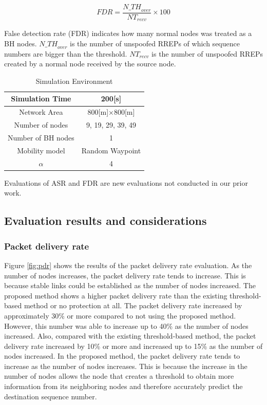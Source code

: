 \documentclass[conference]{IEEEtran}
\begin{document}
\begin{equation}
\label{eq:detectionRate}
FDR=\displaystyle \frac{{N\_TH}_{over}}{NT_{recv}} \times 100
\end{equation}

False detection rate (FDR) indicates how many normal nodes was treated as a BH nodes. ${N\_TH}_{over}$ is the number of unspoofed RREPs of which sequence numbers are bigger than the threshold. $NT_{recv}$ is the number of unspoofed RREPs created by a normal node received by the source node.

\begin{table}[htbp]
\begin{center}
\caption{Simulation Environment}
\label{tab:simEnviro}
\begin{tabular}{|c||c|}
\hline
Simulation Time & 200[s] \\
\hline
Network Area & 800[m]×800[m] \\
\hline
Number of nodes & 9, 19, 29, 39, 49 \\
\hline
Number of BH nodes & 1 \\
\hline
Mobility model & Random Waypoint \\
\hline
$\alpha$ & 4 \\
\hline
\end{tabular}
\end{center}
\end{table}

Evaluations of ASR and FDR are new evaluations not conducted in our prior work\cite{8}.

\subsection{Evaluation results and considerations}

\subsubsection{Packet delivery rate}
Figure \ref{fig:pdr} shows the results of the packet delivery rate evaluation. As the number of nodes increases, the packet delivery rate tends to increase. This is because stable links could be established as the number of nodes increased. The proposed method shows a higher packet delivery rate than the existing threshold-based method or no protection at all. The packet delivery rate increased by approximately 30\% or more compared to not using the proposed method. However, this number was able to increase up to 40\% as the number of nodes increased. Also, compared with the existing threshold-based method, the packet delivery rate increased by 10\% or more and increased up to 15\% as the number of nodes increased. In the proposed method, the packet delivery rate tends to increase as the number of nodes increases. This is because the increase in the number of nodes allows the node that creates a threshold to obtain more information from its neighboring nodes and therefore accurately predict the destination sequence number.
\end{document}
